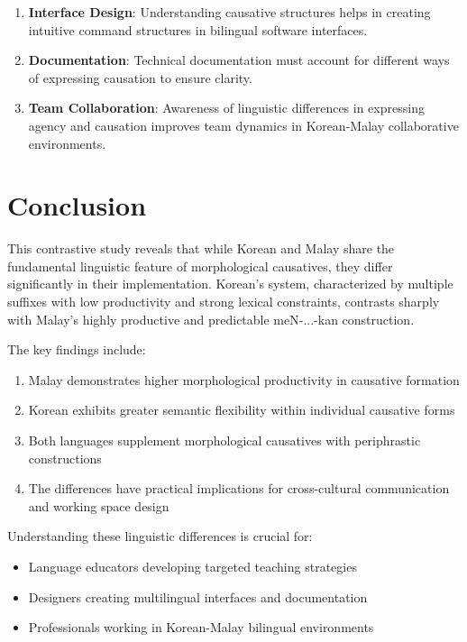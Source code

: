 \documentclass[12pt,a4paper]{article}
\begin{document}
\begin{enumerate}
\item \textbf{Interface Design}: Understanding causative structures helps in creating intuitive command structures in bilingual software interfaces.

\item \textbf{Documentation}: Technical documentation must account for different ways of expressing causation to ensure clarity.

\item \textbf{Team Collaboration}: Awareness of linguistic differences in expressing agency and causation improves team dynamics in Korean-Malay collaborative environments.
\end{enumerate}

\section{Conclusion}

This contrastive study reveals that while Korean and Malay share the fundamental linguistic feature of morphological causatives, they differ significantly in their implementation. Korean's system, characterized by multiple suffixes with low productivity and strong lexical constraints, contrasts sharply with Malay's highly productive and predictable meN-...-kan construction.

The key findings include:

\begin{enumerate}
\item Malay demonstrates higher morphological productivity in causative formation
\item Korean exhibits greater semantic flexibility within individual causative forms
\item Both languages supplement morphological causatives with periphrastic constructions
\item The differences have practical implications for cross-cultural communication and working space design
\end{enumerate}

Understanding these linguistic differences is crucial for:
\begin{itemize}
\item Language educators developing targeted teaching strategies
\item Designers creating multilingual interfaces and documentation
\item Professionals working in Korean-Malay bilingual environments
\end{itemize}
\end{document}
